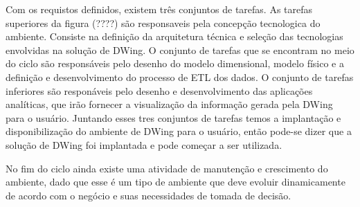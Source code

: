 %

Com os requistos definidos, existem três conjuntos de tarefas. As tarefas superiores da figura (????) são responsaveis pela concepção tecnologica do ambiente. Consiste na definição da arquitetura técnica e  seleção das tecnologias envolvidas na solução de DWing. O conjunto de tarefas que se encontram no meio do ciclo são responsáveis pelo desenho do modelo dimensional, modelo físico e a definição e desenvolvimento do processo de ETL dos dados. O conjunto de tarefas inferiores são responáveis pelo desenho e desenvolvimento das aplicações analíticas, que irão fornecer a visualização da informação gerada pela DWing para o usuário. Juntando esses tres conjuntos de tarefas temos a implantação e disponibilização do ambiente de DWing para o usuário, então pode-se dizer que a solução de DWing foi implantada e pode começar a ser utilizada. 

%

No fim do ciclo ainda existe uma atividade de manutenção e crescimento do ambiente, dado que esse é um tipo de ambiente que deve evoluir dinamicamente de acordo com o negócio e suas necessidades de tomada de decisão.
